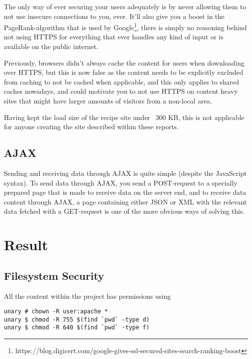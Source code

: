 \documentclass[a4paper]{scrartcl}
\begin{document}
The only way of ever securing your users adequately is by never allowing them to not use insecure connections to you, ever. It'll also give you a boost in the PageRank-algorithm that is used by Google\footnote{https://blog.digicert.com/google-gives-ssl-secured-sites-search-ranking-boost}, there is simply no reasoning behind not using HTTPS for everything that ever handles any kind of input or is available on the public internet.

Previously, browsers didn't always cache the content for users when downloading over HTTPS, but this is now false as the content needs to be explicitly excluded from caching to not be cached when applicable, and this only applies to shared caches nowadays, and could motivate you to not use HTTPS on content heavy sites that might have larger amounts of visitors from a non-local area.

Having kept the load size of the recipe site under ~300 KB, this is not applicable for anyone creating the site described within these reports.

\subsection{AJAX}

Sending and receiving data through AJAX is quite simple (despite the JavaScript syntax). To send data through AJAX, you send a POST-request to a specially prepared page that is made to receive data on the server end, and to receive data content through AJAX, a page containing either JSON or XML with the relevant data fetched with a GET-request is one of the more obvious ways of solving this.

\newpage

\section{Result}
\label{sec:results}

\subsection{Filesystem Security}

All the content within the project has permissions using

\begin{lstlisting}
unary # chown -R user:apache *
unary $ chmod -R 755 $(find `pwd` -type d)
unary $ chmod -R 640 $(find `pwd` -type f)
\end{lstlisting}
\end{document}
